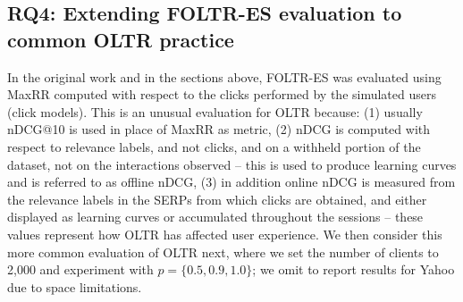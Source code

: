 
%
%


\subsection{RQ4: Extending FOLTR-ES evaluation to common OLTR practice}

In the original work and in the sections above, FOLTR-ES was evaluated using MaxRR computed with respect to the clicks performed by the simulated users (click models). This is an unusual evaluation for OLTR because: (1) usually nDCG@10 is used in place of MaxRR as metric, (2) nDCG is computed with respect to relevance labels, and not clicks, and on a withheld portion of the dataset, not on the interactions observed -- this is used to produce learning curves and is referred to as offline nDCG, (3) in addition online nDCG is measured from the relevance labels in the SERPs from which clicks are obtained, and either displayed as learning curves or accumulated throughout the sessions -- these values represent how OLTR has affected user experience. We then consider this more common evaluation of OLTR next, where we set the number of clients to 2,000 and experiment with $p=\{0.5, 0.9, 1.0\}$; we omit to report results for Yahoo due to space limitations. 



